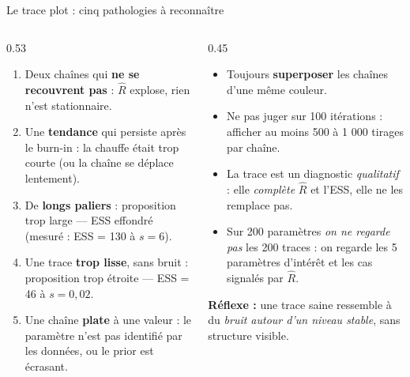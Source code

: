 \begin{frame}{Le trace plot : cinq pathologies à reconnaître}
\small
\begin{columns}[t]
\begin{column}{0.53\textwidth}
\begin{ebox}[Ce qu'on regarde]
\begin{enumerate}
  \item Deux chaînes qui \textbf{ne se recouvrent pas} : \;
        $\hat R$ explose, rien n'est stationnaire.
  \item Une \textbf{tendance} qui persiste après le burn-in : \;
        la chauffe était trop courte (ou la chaîne se déplace lentement).
  \item De \textbf{longs paliers} : \;
        proposition trop large --- ESS effondré (mesuré : ESS = 130 à $s = 6$).
  \item Une trace \textbf{trop lisse}, sans bruit : \;
        proposition trop étroite --- ESS = 46 à $s = 0{,}02$.
  \item Une chaîne \textbf{plate} à une valeur : \;
        le paramètre n'est pas identifié par les données, ou le prior est écrasant.
\end{enumerate}
\end{ebox}
\end{column}
\begin{column}{0.45\textwidth}
\begin{kbox}
\begin{itemize}
  \item Toujours \textbf{superposer} les chaînes d'une même couleur.
  \item Ne pas juger sur 100 itérations : afficher au moins 500 à 1 000 tirages
        par chaîne.
  \item La trace est un diagnostic \emph{qualitatif} : elle \emph{complète}
        $\hat R$ et l'ESS, elle ne les remplace pas.
  \item Sur 200 paramètres \emph{on ne regarde pas} les 200 traces : on regarde
        les 5 paramètres d'intérêt et les cas signalés par $\hat R$.
\end{itemize}
\end{kbox}
\begin{tcolorbox}[colback=byCyan!8,colframe=byCyan,arc=2mm]
\small\textbf{Réflexe :} une trace saine ressemble à du \emph{bruit autour d'un
niveau stable}, sans structure visible.
\end{tcolorbox}
\end{column}
\end{columns}
\end{frame}

